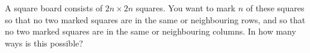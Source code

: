 A square board consists of $2n \times 2n$ squares.
You want to mark $n$ of these squares so that no two marked squares are in the
same or neighbouring rows, and so that no two marked squares are in the
same or neighbouring columns. In how many ways is this possible?
